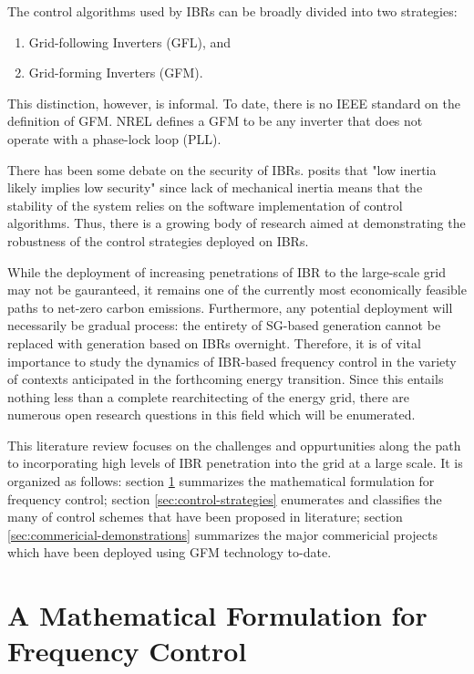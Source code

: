 \documentclass[journal]{IEEEtran}
\begin{document}
The control algorithms used by IBRs can be broadly divided into two strategies:
\begin{enumerate}
  \item Grid-following Inverters (GFL), and
  \item Grid-forming Inverters (GFM).
\end{enumerate}

This distinction, however, is informal. To date, there is no IEEE standard
on the definition of GFM. NREL defines a GFM to be any inverter that does 
not operate with a phase-lock loop (PLL). %

There has been some debate on the security of IBRs. %
posits that "low inertia likely implies low security" since
lack of mechanical inertia means that the stability of the system
relies on the software implementation of control algorithms. Thus,
there is a growing body of research aimed at demonstrating the 
robustness of the control strategies deployed on IBRs.

While the deployment of increasing penetrations of IBR to the large-scale
grid may not be gauranteed, it remains one of the currently most 
economically feasible paths to net-zero carbon emissions. Furthermore,
any potential deployment will necessarily be gradual process: the entirety of
SG-based generation cannot be replaced with generation based on IBRs
overnight. Therefore, it is of vital importance to study the 
dynamics of IBR-based frequency control in the variety of contexts
anticipated in the forthcoming energy transition. Since this
entails nothing less than a complete rearchitecting of the energy
grid, there are numerous open research questions in this field
which will be enumerated.

This literature review focuses on the challenges and oppurtunities along
the path to incorporating high levels of IBR penetration into the grid 
at a large scale. It is organized as follows: section \ref{sec:math-models}
summarizes the mathematical formulation for frequency control; section
\ref{sec:control-strategies} enumerates and classifies the many
of control schemes that have been proposed in literature; section
\ref{sec:commericial-demonstrations} summarizes the major commericial
projects which have been deployed using GFM technology to-date.

\section{A Mathematical Formulation for Frequency Control}
\label{sec:math-models}
\end{document}
